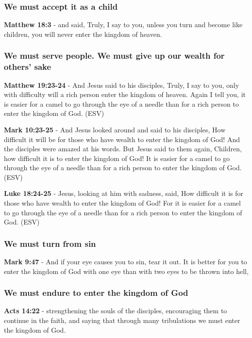 \documentclass[11pt]{article}
\begin{document}
\subsubsection{We must accept it as a child}
\label{sec:org8ba1c7b}
\textbf{Matthew 18:3} - and said, Truly, I say to you, unless you turn and become like children, you will never enter the kingdom of heaven.

\subsubsection{We must serve people. We must give up our wealth for others' sake}
\label{sec:org87be79d}
\textbf{Matthew 19:23-24} - And Jesus said to his disciples, Truly, I say to you, only with difficulty will a rich person enter the kingdom of heaven. Again I tell you, it is easier for a camel to go through the eye of a needle than for a rich person to enter the kingdom of God. (ESV)

\textbf{Mark 10:23-25} - And Jesus looked around and said to his disciples, How difficult it will be for those who have wealth to enter the kingdom of God! And the disciples were amazed at his words. But Jesus said to them again, Children, how difficult it is to enter the kingdom of God! It is easier for a camel to go through the eye of a needle than for a rich person to enter the kingdom of God. (ESV)

\textbf{Luke 18:24-25} - Jesus, looking at him with sadness, said, How difficult it is for those who have wealth to enter the kingdom of God! For it is easier for a camel to go through the eye of a needle than for a rich person to enter the kingdom of God. (ESV)

\subsubsection{We must turn from sin}
\label{sec:orgeb9c290}
\textbf{Mark 9:47} - And if your eye causes you to sin, tear it out. It is better for you to enter the kingdom of God with one eye than with two eyes to be thrown into hell,

\subsubsection{We must endure to enter the kingdom of God}
\label{sec:orgb662d56}
\textbf{Acts 14:22} - strengthening the souls of the disciples, encouraging them to continue in the faith, and saying that through many tribulations we must enter the kingdom of God.
\end{document}
